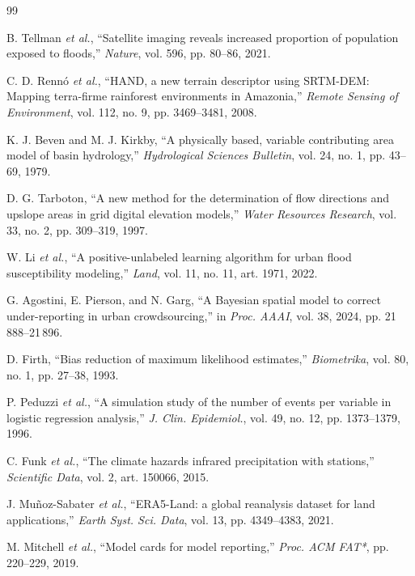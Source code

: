 \documentclass[conference]{IEEEtran}
\begin{document}
\fontsize{5.7}{6.2}\selectfont
\begin{thebibliography}{99}
\setlength{\itemsep}{0.4pt}
\setlength{\parskip}{0pt}

B. Tellman \emph{et al.}, ``Satellite imaging reveals increased proportion of
population exposed to floods,'' \emph{Nature}, vol. 596, pp. 80--86, 2021.

C. D. Rennó \emph{et al.}, ``HAND, a new terrain descriptor using SRTM-DEM:
Mapping terra-firme rainforest environments in Amazonia,''
\emph{Remote Sensing of Environment}, vol. 112, no. 9, pp. 3469--3481, 2008.

K. J. Beven and M. J. Kirkby, ``A physically based, variable contributing area
model of basin hydrology,'' \emph{Hydrological Sciences Bulletin}, vol. 24,
no. 1, pp. 43--69, 1979.

D. G. Tarboton, ``A new method for the determination of flow directions and
upslope areas in grid digital elevation models,'' \emph{Water Resources
Research}, vol. 33, no. 2, pp. 309--319, 1997.

W. Li \emph{et al.}, ``A positive-unlabeled learning algorithm for urban flood
susceptibility modeling,'' \emph{Land},
vol. 11, no. 11, art. 1971, 2022.

G. Agostini, E. Pierson, and N. Garg, ``A Bayesian spatial model to correct
under-reporting in urban crowdsourcing,'' in \emph{Proc. AAAI}, vol. 38, 2024,
pp. 21\,888--21\,896.

D. Firth, ``Bias reduction of maximum likelihood estimates,''
\emph{Biometrika}, vol. 80, no. 1, pp. 27--38, 1993.

P. Peduzzi \emph{et al.}, ``A simulation study of the number of events per
variable in logistic regression analysis,'' \emph{J. Clin. Epidemiol.}, vol. 49,
no. 12, pp. 1373--1379, 1996.

C. Funk \emph{et al.}, ``The climate hazards infrared precipitation with
stations,'' \emph{Scientific Data}, vol. 2, art. 150066, 2015.

J. Muñoz-Sabater \emph{et al.}, ``ERA5-Land: a global reanalysis dataset for land
applications,'' \emph{Earth Syst. Sci. Data}, vol. 13, pp. 4349--4383, 2021.

M. Mitchell \emph{et al.}, ``Model cards for model reporting,'' \emph{Proc. ACM
FAT*}, pp. 220--229, 2019.

\end{thebibliography}
\end{document}
